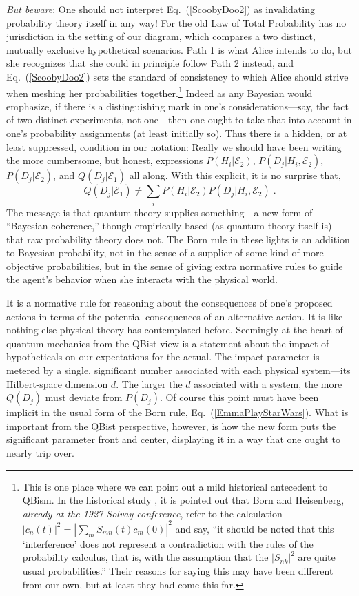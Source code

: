 \documentclass[aps,pra,superscriptaddress,10pt,tightenlines,twocolumn,nofootinbib]{revtex4}
\begin{document}
{\it But beware}:  One should not interpret Eq.~(\ref{ScoobyDoo2}) as invalidating probability theory itself in any way!  For the old Law of Total Probability has no jurisdiction in the setting of our diagram, which compares a two distinct, mutually exclusive hypothetical scenarios.  Path 1 is what Alice intends to do, but she recognizes that she could in principle follow Path 2 instead, and Eq.~(\ref{ScoobyDoo2}) sets the standard of consistency to which Alice should strive when meshing her probabilities together.\footnote{This is one place where we can point out a mild historical antecedent to QBism.  In the historical study \cite{Bacciagaluppi09}, it is pointed out that Born and Heisenberg, {\it already at the 1927 Solvay conference}, refer to the calculation $|c_n(t)|^2=\left|\sum_m S_{mn}(t)c_m(0)\right|^2$ and say, ``it should be noted that this `interference' does not represent a contradiction with the rules of the probability calculus, that is, with the assumption that the $|S_{nk}|^2$ are quite usual probabilities.'' Their reasons for saying this may have been different from our own, but at least they had come this far.}  Indeed as any Bayesian would emphasize, if there is a distinguishing mark in one's considerations---say, the fact of two distinct experiments, not one---then one ought to take that into account in one's probability assignments (at least initially so).  Thus there is a hidden, or at least suppressed, condition in our notation:  Really we should have been writing the more cumbersome, but honest, expressions $P(H_i|{\mathcal E}_2)$, $P(D_j|H_i,{\mathcal E}_2)$, $P(D_j|{\mathcal E}_2)$, and $Q(D_j|{\mathcal E}_1)$ all along.  With this explicit, it is no surprise that,
\begin{equation}
Q(D_j|{\mathcal E}_1)\ne\sum_iP(H_i|{\mathcal E}_2)P(D_j|H_i,{\mathcal E}_2)\;.
\end{equation}
The message is that quantum theory supplies some\-thing---a new form of ``Bayesian coherence,'' though empirically based (as quantum theory itself is)---that raw probability theory does not.  The Born rule in these lights is an addition to Bayesian probability, not in the sense of a supplier of some kind of more-objective probabilities, but in the sense of giving extra normative rules to guide the agent's behavior when she interacts with the physical world.

It is a normative rule for reasoning about the consequences of one's proposed actions in terms of the potential consequences of an alternative action.  It is like nothing else physical theory has contemplated before.  Seemingly at the heart of quantum mechanics from the QBist view is a statement about the impact of hypotheticals on our expectations for the actual.  The impact parameter is metered by a single, significant number associated with each physical system---its Hilbert-space dimension $d$.  The larger the $d$ associated with a system, the more $Q(D_j)$ must deviate from $P(D_j)$.  Of course this point must have been implicit in the usual form of the Born rule, Eq.~(\ref{EmmaPlayStarWars}).  What is important from the QBist perspective, however, is how the new form puts the significant parameter front and center, displaying it in a way that one ought to nearly trip over.
\end{document}
